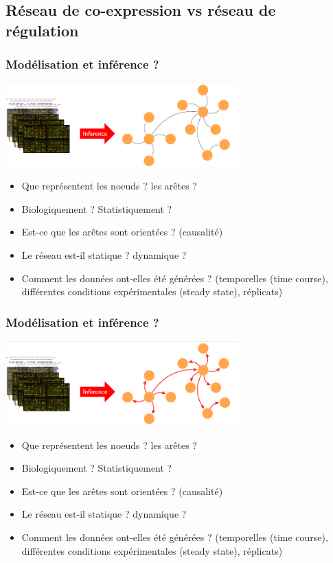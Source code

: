 	
\subsection{Réseau de co-expression vs réseau de régulation}



\begin{frame}
\frametitle{Modélisation et inférence ? }
\vspace{-0.1cm}
\begin{center}
\includegraphics[width=9cm]{Figures/Intro/inference.png}
\end{center}
\vspace{-0.15cm}
\begin{itemize}\small
\item Que représentent les noeuds ? les arêtes ?
\item Biologiquement ? Statistiquement ? 
\item Est-ce que les arêtes sont orientées ? (causalité)
\item Le réseau est-il statique ? dynamique ? 
\item Comment les données ont-elles été générées ? (temporelles (time course), différentes conditions expérimentales (steady state), réplicats)
\end{itemize}

\end{frame}

\begin{frame}
\frametitle{Modélisation et inférence ? }
\vspace{-0.1cm}
\begin{center}
\includegraphics[width=9cm]{Figures/Intro/inference_oriente.png}
\end{center}
\vspace{-0.15cm}
\begin{itemize}\small
\item Que représentent les noeuds ? les arêtes ?
\item Biologiquement ? Statistiquement ? 
\item Est-ce que les arêtes sont orientées ? (causalité)
\item Le réseau est-il statique ? dynamique ? 
\item Comment les données ont-elles été générées ? (temporelles (time course), différentes conditions expérimentales (steady state), réplicats)
\end{itemize}

\end{frame}

